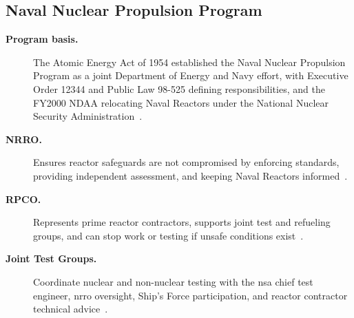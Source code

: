 \documentclass[../main.tex]{subfiles}
\begin{document}
\subsection{Naval Nuclear Propulsion Program}
\begin{description}
  \item[\textbf{Program basis.}] The Atomic Energy Act of 1954 established the Naval Nuclear Propulsion Program as a joint Department of Energy and Navy effort, with Executive Order 12344 and Public Law 98-525 defining responsibilities, and the FY2000 NDAA relocating Naval Reactors under the National Nuclear Security Administration~\autocite{edo-4-1-5-waterfront-work-control-2025}.
  \item[\textbf{NRRO.}] Ensures reactor safeguards are not compromised by enforcing standards, providing independent assessment, and keeping Naval Reactors informed~\autocite{edo-4-1-5-waterfront-work-control-2025}.
  \item[\textbf{RPCO.}] Represents prime reactor contractors, supports joint test and refueling groups, and can stop work or testing if unsafe conditions exist~\autocite{edo-4-1-5-waterfront-work-control-2025}.
  \item[\textbf{Joint Test Groups.}] Coordinate nuclear and non-nuclear testing with the \ac{nsa} chief test engineer, \ac{nrro} oversight, Ship's Force participation, and reactor contractor technical advice~\autocite{edo-4-1-5-waterfront-work-control-2025}.
\end{description}
\end{document}
